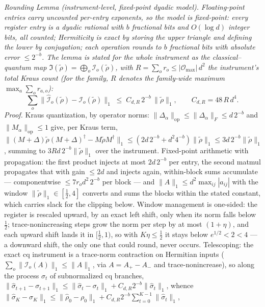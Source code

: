 \documentclass[
]{article}
\begin{document}
\emph{Rounding Lemma (instrument-level, fixed-point dyadic model).}
\emph{Floating-point entries carry uncounted per-entry exponents, so the
model is fixed-point: every register entry is a dyadic rational with
\(b\) fractional bits and \(O(\log d)\) integer bits, all counted;
Hermiticity is exact by storing the upper triangle and defining the
lower by conjugation; each operation rounds to \(b\) fractional bits
with absolute error \(\leq 2^{-b}\). The lemma is stated for the whole
instrument as the classical--quantum map
\(\mathfrak{I}(\tilde\rho) = \bigoplus_o \mathcal{I}_o(\tilde\rho)\),
with \(R = \sum_o r_o \leq |\mathcal{O}_{\max}|\, d^2\) the instrument's
total Kraus count (for the family, \(R\) denotes the family-wide maximum
\(\max_a \sum_o r_{a,o}\)):}
\[\sum_o \big\|\widehat{\mathcal{I}}_o(\tilde\rho) - \mathcal{I}_o(\tilde\rho)\big\|_1 \;\leq\; C_{d,R}\, 2^{-b}\, \|\tilde\rho\|_1, \qquad C_{d,R} = 48\, R\, d^4.\]
\emph{Proof.} Kraus quantization, by operator norms:
\(\|\Delta_\alpha\|_{\mathrm{op}} \leq \|\Delta_\alpha\|_F \leq d\, 2^{-b}\)
and \(\|M_\alpha\|_{\mathrm{op}} \leq 1\) give, per Kraus term,
\(\|(M{+}\Delta)\tilde\rho(M{+}\Delta)^\dagger - M\tilde\rho M^\dagger\|_1 \leq (2d\,2^{-b} + d^2 4^{-b})\|\tilde\rho\|_1 \leq 3d\,2^{-b}\|\tilde\rho\|_1\),
summing to \(3Rd\,2^{-b}\|\tilde\rho\|_1\) over the instrument.
Fixed-point arithmetic with propagation: the first product injects at
most \(2d\,2^{-b}\) per entry, the second matmul propagates that with
gain \(\leq 2d\) and injects again, within-block sums accumulate ---
componentwise \(\leq 7 r_o d^2\, 2^{-b}\) per block --- and
\(\|A\|_1 \leq d^2 \max_{ij}|a_{ij}|\) with the window
\(\|\tilde\rho\|_1 \in [\tfrac12, 4]\) converts and sums the blocks
within the stated constant, which carries slack for the clipping below.
Window management is one-sided: the register is rescaled upward, by an
exact left shift, only when its norm falls below \(\tfrac12\);
trace-nonincreasing steps grow the norm per step by at most
\((1{+}\eta)\), and each upward shift lands it in \([\tfrac12, 1)\), so
with \(K\eta \leq \tfrac12\) it stays below \(e^{1/2} < 2 < 4\) --- a
downward shift, the only one that could round, never occurs.
Telescoping: the exact cq instrument is a trace-norm contraction on
Hermitian inputs (\(\sum_o \|\mathcal{I}_o(A)\|_1 \leq \|A\|_1\), via
\(A = A_+ - A_-\) and trace-nonincrease), so along the process
\(\sigma_t\) of subnormalized cq branches,
\(\|\widehat\sigma_{t+1} - \sigma_{t+1}\|_1 \leq \|\widehat\sigma_t - \sigma_t\|_1 + C_{d,R} 2^{-b} \|\widehat\sigma_t\|_1\),
whence
\(\|\widehat\sigma_K - \sigma_K\|_1 \leq \|\widehat\rho_0 - \rho_0\|_1 + C_{d,R}2^{-b}\sum_{t=0}^{K-1}\|\widehat\sigma_t\|_1\),
\end{document}
